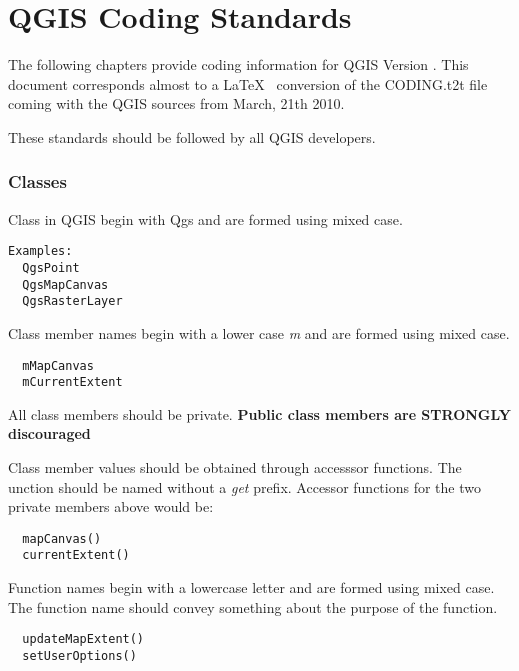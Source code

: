 

\section{QGIS Coding Standards}

The following chapters provide coding information for QGIS Version \CURRENT.
This document corresponds almost to a \LaTeX~ conversion of the CODING.t2t
file coming with the QGIS sources from March, 21th 2010.

These standards should be followed by all QGIS developers.

\subsubsection{Classes}
Class in QGIS begin with Qgs and are formed using mixed case. 

\begin{verbatim}
Examples:
  QgsPoint
  QgsMapCanvas
  QgsRasterLayer
\end{verbatim}

Class member names begin with a lower case \textit{m} and are formed using mixed
case.

\begin{verbatim}
  mMapCanvas  
  mCurrentExtent
\end{verbatim}

All class members should be private.
\textbf{Public class members are STRONGLY discouraged}

Class member values should be obtained through accesssor functions. The
unction should be named without a \textit{get} prefix. Accessor functions for the
two private members above would be: 

\begin{verbatim}
  mapCanvas()
  currentExtent()
\end{verbatim}

Function names begin with a lowercase letter and are formed using mixed case.
The function name should convey something about the purpose of the function.

\begin{verbatim}
  updateMapExtent()
  setUserOptions()
\end{verbatim}

